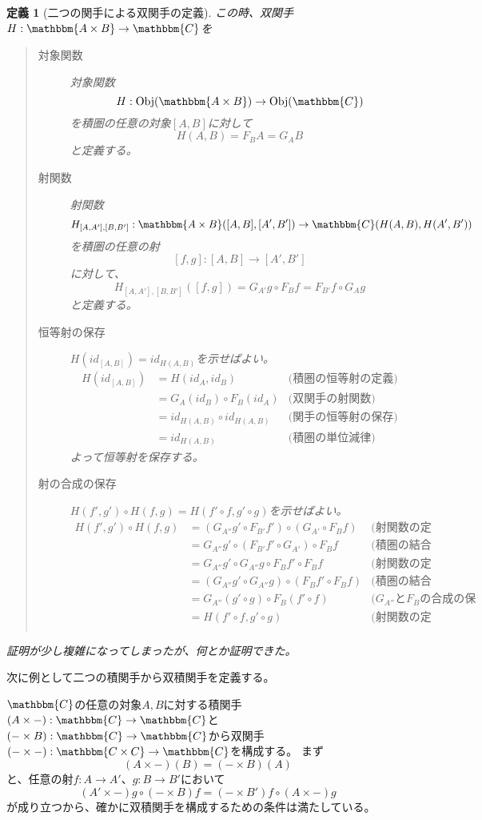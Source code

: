 \documentclass[uplatex,dvipdfmx]{jsarticle}
\newcommand{\cat}[1]{\mathbbm{#1}}
\newcommand{\arrow}{\rightarrow}
\newcommand{\functor}[3]{#1:\cat{#2}\arrow \cat{#3}}
\newcommand{\obj}[1]{\mathrm{Obj}(\cat{#1})}
\newcommand{\mor}[3]{#1:#2\arrow #3}
\newcommand{\arset}[3]{\cat{#1}(#2,#3)}
\newcommand{\pcobj}[1]{[#1]}
\newtheorem{define}{定義}[section]
\numberwithin{proof}{subsection}
\numberwithin{prop}{subsection}
\numberwithin{define}{subsection}
\begin{document}
\begin{define}[二つの関手による双関手の定義]
		この時、双関手$\functor{H}{A\times B}{C}$を
		\begin{quote}
			\begin{description}
				\item[対象関数] 対象関数\[\mor{H}{\obj{A\times B}}{\obj{C}}\]を積圏の任意の対象$\pcobj{A,B}$に対して
				\[H(A,B)={F_B}A={G_A}B\]と定義する。
				\item[射関数]射関数\[\mor{H_{\pcobj{A,A'},\pcobj{B,B'}}}{\arset{A\times B}{\pcobj{A,B}}{\pcobj{A',B'}}}{\arset{C}{H(A,B)}{H(A',B')}}\]を積圏の任意の射\[\mor{\pcobj{f,g}}{\pcobj{A,B}}{\pcobj{A',B'}}\]に対して、\[H_{\pcobj{A,A'},\pcobj{B,B'}}(\pcobj{f,g})={G_{A'}}g\circ {F_B}f = {F_{B'}}f\circ {G_A}g\]と定義する。
				\item[恒等射の保存]$H(id_{\pcobj{A,B}})=id_{H(A,B)}$を示せばよい。
				\begin{align*}
					H(id_{\pcobj{A,B}})&=H(id_A,id_B)&\text{(積圏の恒等射の定義)}\\
					&=G_A(id_B)\circ F_B(id_A)&\text{(双関手の射関数)}\\
					&=id_{H(A,B)}\circ id_{H(A,B)}&\text{(関手の恒等射の保存)}\\
					&=id_{H(A,B)}&\text{(積圏の単位減律)}
				\end{align*}
				よって恒等射を保存する。
				\item[射の合成の保存]$H(f',g')\circ H(f,g)=H(f'\circ f,g'\circ g)$を示せばよい。
				\begin{align*}
					H(f',g')\circ H(f,g)&=(G_{A''}g'\circ F_{B'}f')\circ(G_{A'}\circ F_Bf)&\text{(射関数の定義)}\\
					&=G_{A''}g'\circ (F_{B'}f'\circ G_{A'})\circ  F_Bf&\text{(積圏の結合律)}\\
					&=G_{A''}g'\circ G_{A''}g\circ F_Bf'\circ  F_Bf&\text{(射関数の定義)}\\
					&=(G_{A''}g'\circ G_{A''}g)\circ (F_Bf'\circ  F_Bf)&\text{(積圏の結合則)}\\
					&=G_{A''}(g'\circ g)\circ F_B(f'\circ f)&\text{($G_{A''}$と$F_B$の合成の保存)}\\
					&=H(f'\circ f,g'\circ g)&\text{(射関数の定義)}\\
				\end{align*}
			\end{description}
		\end{quote}
		証明が少し複雑になってしまったが、何とか証明できた。
	\end{define}
	次に例として二つの積関手から双積関手を定義する。

	$\cat{C}$の任意の対象$A,B$に対する積関手$\functor{(A\times -)}{C}{C}$と$\functor{(-\times B)}{C}{C}$から双関手$\functor{(-\times -)}{C\times C}{C}$を構成する。
	まず\[(A\times -)(B)=(-\times B)(A)\]と、任意の射$\mor{f}{A}{A'}$、$\mor{g}{B}{B'}$において
	\[(A'\times -)g\circ (-\times B)f=(-\times B')f\circ(A\times -)g\]が成り立つから、確かに双積関手を構成するための条件は満たしている。
\end{document}
